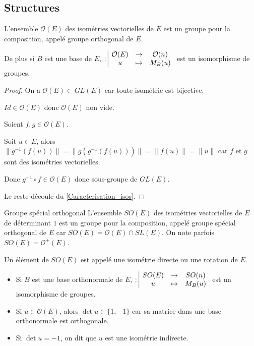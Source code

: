 \subsection{Structures}

\begin{proposition}{}{}
    L'ensemble $\mathcal O(E)$ des isométries vectorielles de $E$ est un groupe pour la composition, 
    appelé groupe orthogonal de $E$.

    De plus si $B$ est une base de $E$, $: \space \begin{array}{|ccc} \displaystyle \mathcal O(E) & \to & \displaystyle \mathcal O(n) \\ \displaystyle u & \mapsto & \displaystyle M_B(u) \end{array}$ est un isomorphisme de groupes.
\end{proposition}

\begin{proof}
    On a $\mathcal O(E) \subset GL(E)$ car toute isométrie est bijective.

    $Id \in \mathcal O(E)$ donc $\mathcal O(E)$ non vide.

    Soient $f, g \in \mathcal O(E)$. 

    Soit $u \in E$, alors $\| g^{-1} (f(u)) \| = \| g (g^{-1} (f(u))) \| = \| f(u) \| = \| u \|$ 
    car $f$ et $g$ sont des isométries vectorielles. 

    Donc $g^{-1} \circ f \in \mathcal O(E)$ donc sous-groupe de $GL(E)$.

    Le reste découle du \ref{Caracterisation_isos}.
\end{proof}

\begin{definition}{Groupe spécial orthogonal}{}
    L'ensemble $SO(E)$ des isométries vectorielles de $E$ de déterminant $1$ est un groupe 
    pour la composition, appelé groupe spécial orthogonal de $E$ car 
    $SO(E) = \mathcal O(E) \cap SL(E)$.
    On note parfois $SO(E) = \mathcal O^+(E)$. 

    Un élément de $SO(E)$ est appelé une isométrie directe ou une rotation de $E$. 

    \begin{itemize}
        \item Si $B$ est une base orthonormale de $E$, $: \space \begin{array}{|ccc} \displaystyle SO(E) & \to & \displaystyle SO(n) \\ \displaystyle u & \mapsto & \displaystyle M_B(u) \end{array}$ est un isomorphisme de groupes.
        \item Si $u \in \mathcal O(E)$, alors $\det u \in \{1, -1 \}$ car sa matrice dans une base orthonormale est orthogonale. 
        \item Si $\det u = -1$, on dit que $u$ est une isométrie indirecte. 
    \end{itemize}
\end{definition}

